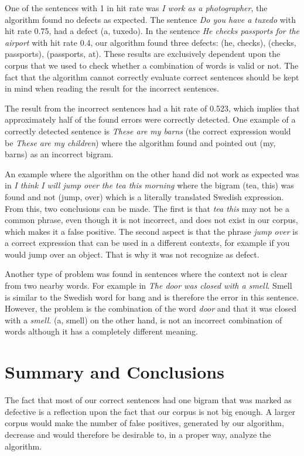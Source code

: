 \documentclass[a4paper,12pt]{article}
\begin{document}
One of the sentences with 1 in hit rate was \emph{I work as a photographer}, the algorithm found no defects as expected. The sentence \emph{Do you have a tuxedo} with hit rate 0.75, had a defect (a, tuxedo). In the sentence \emph{He checks passports for the airport} with hit rate 0.4, our algorithm found three defects: (he, checks), (checks, passports), (passports, at). These results are exclusively dependent upon the corpus that we used to check whether a combination of words is valid or not. The fact that the algorithm cannot correctly evaluate correct sentences should be kept in mind when reading the result for the incorrect sentences.

The result from the incorrect sentences had a hit rate of 0.523, which implies that approximately half of the found errors were correctly detected. One example of a correctly detected sentence is \emph{These are my barns} (the correct expression would be \emph{These are my children}) where the algorithm found and pointed out (my, barns) as an incorrect bigram. 

An example where the algorithm on the other hand did not work as expected was in \emph{I think I will jump over the tea this morning} where the bigram (tea, this) was found and not (jump, over) which is a literally translated Swedish expression. From this, two conclusions can be made. The first is that \emph{tea this} may not be a common phrase, even though it is not incorrect, and does not exist in our corpus, which makes it a false positive. The second aspect is that the phrase \emph{jump over} is a correct expression that can be used in a different contexts, for example if you would jump over an object. That is why it was not recognize as defect. 

Another type of problem was found in sentences where the context not is clear from two nearby words. For example in \emph{The door was closed with a smell}. Smell is similar to the Swedish word for bang and is therefore the error in this sentence. However, the problem is the combination of the word \emph{door} and that it was closed with a \emph{smell}. (a, smell) on the other hand, is not an incorrect combination of words although it has a completely different meaning.

\section{Summary and Conclusions}
\label{sec:summary}
The fact that most of our correct sentences had one bigram that was marked as defective is a reflection upon the fact that our corpus is not big enough. A larger corpus would make the number of false positives, generated by our algorithm, decrease and would therefore be desirable to, in a proper way, analyze the algorithm.
\end{document}
